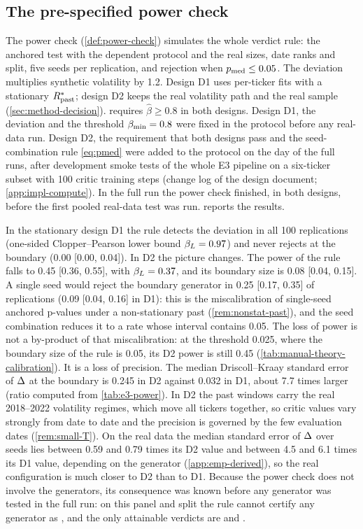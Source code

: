 \subsection{The pre-specified power check}\label{sec:emp-power}

The power check (\cref{def:power-check}) simulates the whole verdict rule: the anchored \WC{}
test with the dependent protocol and the real sizes, date ranks and split, five seeds per
replication, and rejection when $p_{\mathrm{med}}\le0.05$. The deviation multiplies synthetic volatility
by 1.2. Design D1 uses per-ticker \GARCHt{} fits with a stationary $R_{\mathrm{past}}^*$; design D2 keeps the real \TRAIN{} volatility path and the real \TEST{}
sample (\cref{sec:method-decision}). \GOOD{} requires $\hat\beta\ge0.8$ in both designs.
Design D1, the deviation and the threshold $\beta_{\min}=0.8$ were fixed in the protocol before any
real-data run. Design D2, the requirement that both designs pass and the seed-combination rule
\eqref{eq:pmed} were added to the protocol on the day of the full runs, after development smoke
tests of the whole E3 pipeline on a six-ticker subset with 100 critic training steps (change log
of the design document; \cref{app:impl-compute}). In the full run the power check finished, in both designs, before the
first pooled real-data test was run.  reports the results.

In the stationary design D1 the rule detects the deviation in all 100 replications (one-sided
Clopper--Pearson lower bound $\beta_{L}=0.97$) and never rejects at the boundary (0.00 [0.00,
0.04]). In D2 the picture changes. The power of the rule falls to 0.45 [0.36, 0.55], with
$\beta_{L}=0.37$, and its boundary size is 0.08 [0.04, 0.15]. A single seed would reject the
boundary generator in 0.25 [0.17, 0.35] of replications (0.09 [0.04, 0.16] in D1): this is the
miscalibration of single-seed anchored p-values under a non-stationary past
(\cref{rem:nonstat-past}), and the seed combination reduces it to a rate whose interval contains
0.05. The loss of power is not a by-product of that miscalibration: at the threshold 0.025, where
the boundary size of the rule is 0.05, its D2 power is still 0.45
(\cref{tab:manual-theory-calibration}). It is a loss of precision. The median Driscoll--Kraay
standard error of $\Delta$ at the boundary is 0.245 in D2 against 0.032 in D1, about 7.7 times larger (ratio
computed from \cref{tab:e3-power}). In D2 the past windows carry the real 2018--2022 volatility
regimes, which move all tickers together, so critic values vary strongly from date to date and
the precision is governed by the few evaluation dates (\cref{rem:small-T}). On the
real data the median standard error of $\Delta$ over seeds lies between 0.59 and 0.79 times its
D2 value and between 4.5 and 6.1 times its D1 value, depending on the generator
(\cref{app:emp-derived}), so the real configuration is much closer to D2 than to
D1. Because the power check does not involve the generators, its consequence was known before
any generator was tested in the full run: on this panel and split the rule cannot certify any
generator as \GOOD{}, and the only attainable verdicts are \BAD{} and \INCONCL{}.


